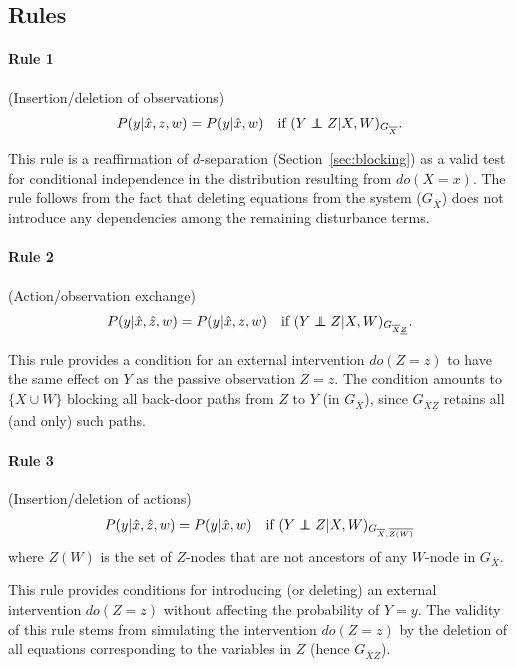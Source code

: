 \documentclass[11pt]{article}
\numberwithin{equation}{section}
\newcommand\indep{\protect\mathpalette{\protect\independenT}{\perp}}
\def\independenT#1#2{\mathrel{\rlap{$#1#2$}\mkern2mu{#1#2}}}
\begin{document}
\subsection{Rules} \label{sec:Rules}

\paragraph{Rule 1} (Insertion/deletion of observations)
\begin{equation}
P(y|\hat{x}, z, w) = P(y| \hat{x}, w) \quad \text{if}\ (Y \indep Z|X,W)_{G_{{\overline{X}}}}.
\end{equation}

This rule is a reaffirmation of $d$-separation (Section~\ref{sec:blocking}) as a valid test for conditional independence in the distribution resulting from $do(X=x)$. The rule follows from the fact that deleting equations from the system ($G_{{\overline{X}}}$) does not introduce any dependencies among the remaining disturbance terms.


\paragraph{Rule 2} (Action/observation exchange)
\begin{equation}
P(y|\hat{x},\hat{z},w) = P(y|\hat{x},z,w) \quad \text{if}\ (Y \indep Z|X,W)_{G_{{\overline{X}\underline{Z}}}}.
\end{equation}

This rule provides a condition for an external intervention $do(Z=z)$ to have the same effect on $Y$ as the passive observation $Z=z$. The condition amounts to $\{X \cup W\}$ blocking all back-door paths from $Z$ to $Y$ (in $G_{\overline{X}}$), since $G_{\overline{X}\underline{Z}}$ retains all (and only) such paths.

\paragraph{Rule 3} (Insertion/deletion of actions)
\begin{equation}
P(y|\hat{x},\hat{z},w) = P(y|\hat{x},w) \quad \text{if}\ (Y \indep Z|X,W)_{G_{{\overline{X},\overline{Z(W)}}}}
\end{equation}
where $Z(W)$ is the set of $Z$-nodes that are not ancestors of any $W$-node in $G_{\overline{X}}$.

This rule provides conditions for introducing (or deleting) an external intervention $do(Z=z)$ without affecting the probability of $Y=y$. The validity of this rule stems from simulating the intervention $do(Z=z)$ by the deletion of all equations corresponding to the variables in $Z$ (hence $G_{\overline{X} \overline{Z}}$).
\end{document}
